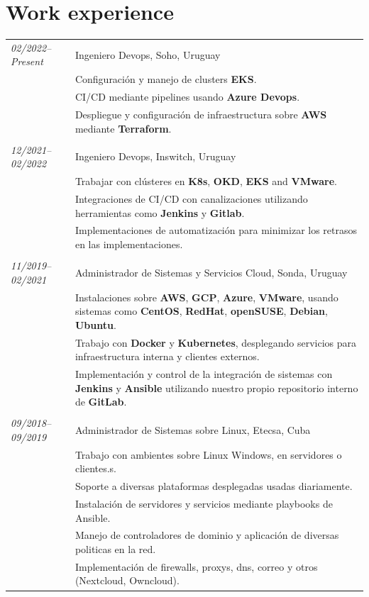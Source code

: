 \documentclass[a4paper,12pt]{article}
\begin{document}
\section{Work experience}
\justify
\begin{tabular}{p{2.9cm}| p{16cm}}
\emph{02/2022–Present} & Ingeniero Devops, Soho, Uruguay \\
\textsc{}&\footnotesize{Configuración y manejo de clusters \textbf{EKS}.}\\
\textsc{}&\footnotesize{CI/CD mediante pipelines usando \textbf{Azure Devops}.}\\
\textsc{}&\footnotesize{Despliegue y configuración de infraestructura sobre \textbf{AWS} mediante \textbf{Terraform}.}\\

\multicolumn{2}{c}{} \\  
\emph{12/2021–02/2022} & Ingeniero Devops, Inswitch, Uruguay \\
\textsc{}&\footnotesize{Trabajar con clústeres en \textbf{K8s}, \textbf{OKD}, \textbf{EKS} and \textbf{VMware}.}\\
\textsc{}&\footnotesize{Integraciones de CI/CD con canalizaciones utilizando herramientas como \textbf{Jenkins} y \textbf{Gitlab}.}\\
\textsc{}&\footnotesize{Implementaciones de automatización para minimizar los retrasos en las implementaciones.}\\

\multicolumn{2}{c}{} \\  
\emph{11/2019–02/2021} & Administrador de Sistemas y Servicios Cloud, Sonda, Uruguay \\
\textsc{}&\footnotesize{Instalaciones sobre \textbf{AWS}, \textbf{GCP}, \textbf{Azure}, \textbf{VMware}, usando sistemas como \textbf{CentOS}, \textbf{RedHat}, \textbf{openSUSE}, \textbf{Debian}, \textbf{Ubuntu}.}\\
\textsc{}&\footnotesize{Trabajo con \textbf{Docker} y \textbf{Kubernetes}, desplegando servicios para infraestructura interna y clientes externos.}\\
\textsc{}&\footnotesize{Implementación y control de la integración de sistemas con \textbf{Jenkins} y \textbf{Ansible} utilizando nuestro propio repositorio interno de \textbf{GitLab}.}\\

\multicolumn{2}{c}{} \\  
\emph{09/2018–09/2019} & Administrador de Sistemas sobre Linux, Etecsa, Cuba\\
\textsc{}&\footnotesize{Trabajo con ambientes sobre Linux Windows, en servidores o clientes.s.}\\
\textsc{}&\footnotesize{Soporte a diversas plataformas desplegadas usadas diariamente.}\\
\textsc{}&\footnotesize{Instalación de servidores y servicios mediante playbooks de Ansible.}\\
\textsc{}&\footnotesize{Manejo de controladores de dominio y aplicación de diversas politicas en la red.}\\
\textsc{}&\footnotesize{Implementaci\'on de firewalls, proxys, dns, correo y otros (Nextcloud, Owncloud).}\\


\end{tabular}
\end{document}
